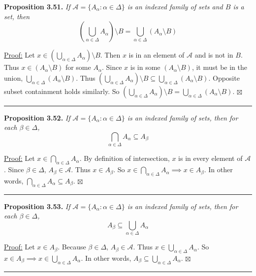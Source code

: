 \documentclass[a4paper,12pt]{article}
\newcommand{\entry}[3]
{
   \noindent\textbf{#1.}
   \emph{#2}
   \bigskip

   \noindent#3
   \bigskip
   \hrule
   \vspace{24pt}
}
\newcommand{\biguni}[1]
{
\displaystyle\bigcup_{#1}
}
\newcommand{\bigint}[1]
{
\displaystyle\bigcap_{#1}
}
\newcommand{\scripta}{\mathscr{A}}
\newcommand{\sig}{$\boxtimes$}
\begin{document}
\entry{Proposition 3.51}
{If $\scripta = \{ A_\alpha : \alpha \in \Delta \}$ is an indexed family of sets and $B$ is a set, then \[ (\biguni{\alpha \in \Delta} A_\alpha) \setminus B = \biguni{\alpha \in \Delta} (A_\alpha \setminus B) \]}
{
\underline{Proof:} Let $x \in (\biguni{\alpha \in \Delta} A_\alpha) \setminus B$. Then $x$ is in an element of $\scripta$ and is not in $B$. Thus $x \in (A_\alpha \setminus B)$ for some $A_\alpha$. Since $x$ is in some $(A_\alpha \setminus B)$, it must be in the union, $\biguni{\alpha \in \Delta} (A_\alpha \setminus B)$. Thus $(\biguni{\alpha \in \Delta} A_\alpha) \setminus B \subseteq \biguni{\alpha \in \Delta} (A_\alpha \setminus B)$. Opposite subset containment holds similarly. So $(\biguni{\alpha \in \Delta} A_\alpha) \setminus B = \biguni{\alpha \in \Delta} (A_\alpha \setminus B)$. \sig
}



\entry{Proposition 3.52}
{If $\scripta = \{ A_\alpha : \alpha \in \Delta \}$ is an indexed family of sets, then for each $\beta \in \Delta$, \[ \bigint{\alpha \in \Delta} A_\alpha \subseteq A_\beta \]}
{
\underline{Proof:} Let $x \in \bigint{\alpha \in \Delta} A_\alpha$. By definition of intersection, $x$ is in every element of $\scripta$. Since $\beta \in \Delta$, $A_\beta \in \scripta$. Thus $x \in A_\beta$. So $x \in \bigint{\alpha \in \Delta} A_\alpha \implies x \in A_\beta$. In other words, $\bigint{\alpha \in \Delta} A_\alpha \subseteq A_\beta$. \sig
}



\entry{Proposition 3.53}
{If $\scripta = \{ A_\alpha : \alpha \in \Delta \}$ is an indexed family of sets, then for each $\beta \in \Delta$, \[ A_\beta \subseteq \biguni{\alpha \in \Delta} A_\alpha \]}
{
\underline{Proof:} Let $x \in A_\beta$. Because $\beta \in \Delta$, $A_\beta \in \scripta$. Thus $x \in \biguni{\alpha \in \Delta} A_\alpha$. So $x \in A_\beta \implies x \in \biguni{\alpha \in \Delta} A_\alpha$. In other words, $A_\beta \subseteq \biguni{\alpha \in \Delta} A_\alpha$. \sig
}
\end{document}
